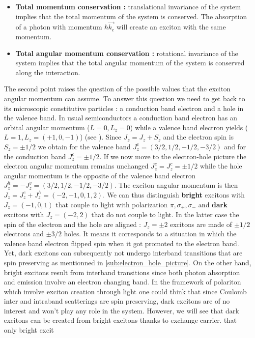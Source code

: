 \begin{itemize}
    \item \textbf{Total momentum conservation :}  translational invariance of the system implies that the total momentum of the system is conserved. The absorption of a photon with momentum 
    $\hbar \vec{k_c}$ will create an exciton with the same momentum.
    \item  \textbf{Total angular momentum conservation :} rotational invariance of the system implies that the total angular momentum of the system is conserved along the interaction.
\end{itemize}

The second point raises the question of the possible values that the exciton angular momentum can assume. To answer this question we need to get back to its 
microscopic constitutive particles : a conduction band electron and a hole in the valence band. In usual semiconductors a conduction band electron has an orbital angular momentum ($L=0 , L_z=0$) while a valence band electron yields ($L=1 , L_z=(+1,0,-1)$) (see \cite{kittel_introduction_2005}).
Since $J_z = J_z + S_z$ and the electron spin is $S_z = \pm 1/2$ we obtain for the valence band $J_z^{v} = (3/2, 1/2, -1/2, -3/2)$ and for the conduction band $J_z^{c} = \pm 1/2$. If we now move to the electron-hole picture the electron angular momentum remains unchanged $J_z^{e}=J_z^{c}= \pm 1/2$ while the hole angular momentum is the opposite of the valence band electron $J_z^{h} = -J_z^{v}=(3/2, 1/2, -1/2, -3/2)$.
 The exciton angular momentum is then $J_z = J_z^{e} + J_z^{h} = (-2,-1,0,1,2)$. We can thus distinguish \textbf{bright} excitons with $J_z = (-1,0,1)$ that couple to light with polarization $\pi , \sigma_+ , \sigma_-$ and \textbf{dark} excitons with $J_z = (-2,2)$ that do not couple to light. 
In the latter case the spin of the electron and the hole are aligned : $J_z= \pm 2$ excitons are made of $\pm1/2$ electrons and $\pm3/2$ holes. It means it corresponds to a situation in which the valence band electron flipped spin when it got promoted to the electron band. Yet, dark excitons can subsequently not undergo interband transitions that are spin preserving as mentionned in \autoref{sub:electron_hole_picture}. 
On the other hand, bright excitons result from interband transitions since both photon absorption and emission involve an electron changing band. In the framework of polariton which involve exciton creation through light one could think that since
Coulomb inter and intraband scatterings are spin preserving, dark excitons are of no interest and won't play any role in the system. However, we will see that dark excitons can be created from bright excitons thanks to exchange carrier.
that only bright excit



